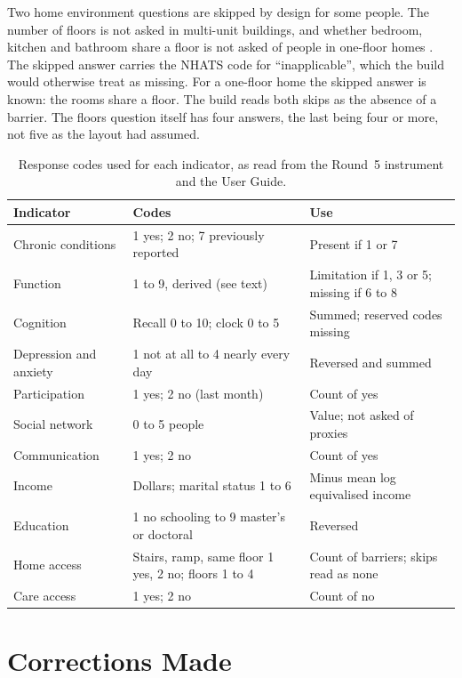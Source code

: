 Two home environment questions are skipped by design for some people. The
number of floors is not asked in multi-unit buildings, and whether bedroom,
kitchen and bathroom share a floor is not asked of people in one-floor homes
\citep{nhats_r5_instrument_2024}. The skipped answer carries the NHATS code for
``inapplicable'', which the build would otherwise treat as missing. For a
one-floor home the skipped answer is known: the rooms share a floor. The build
reads both skips as the absence of a barrier. The floors question itself has
four answers, the last being four or more, not five as the layout had assumed.

\begin{table}[htbp]
\centering
\caption{Response codes used for each indicator, as read from the Round~5 instrument and the User Guide.}
\label{tab:G_codes}
\footnotesize
\renewcommand{\arraystretch}{1.15}
\begin{tabular}{p{3.0cm} p{5.6cm} p{5.4cm}}
\toprule
\textbf{Indicator} & \textbf{Codes} & \textbf{Use} \\
\midrule
Chronic conditions & 1 yes; 2 no; 7 previously reported & Present if 1 or 7 \\
Function & 1 to 9, derived (see text) & Limitation if 1, 3 or 5; missing if 6 to 8 \\
Cognition & Recall 0 to 10; clock 0 to 5 & Summed; reserved codes missing \\
Depression and anxiety & 1 not at all to 4 nearly every day & Reversed and summed \\
Participation & 1 yes; 2 no (last month) & Count of yes \\
Social network & 0 to 5 people & Value; not asked of proxies \\
Communication & 1 yes; 2 no & Count of yes \\
Income & Dollars; marital status 1 to 6 & Minus mean log equivalised income \\
Education & 1 no schooling to 9 master's or doctoral & Reversed \\
Home access & Stairs, ramp, same floor 1 yes, 2 no; floors 1 to 4 & Count of barriers; skips read as none \\
Care access & 1 yes; 2 no & Count of no \\
\bottomrule
\end{tabular}
\end{table}

\section{Corrections Made}
\label{sec:G_changes}

